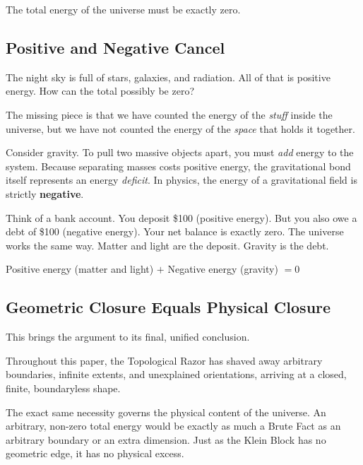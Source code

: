 \documentclass[11pt]{article}
\theoremstyle{canonstyle}
\begin{document}
\begin{keyresult}
The total energy of the universe must be exactly zero.
\end{keyresult}

\subsection{Positive and Negative Cancel}

\begin{reflect}
The night sky is full of stars, galaxies, and radiation. All of that is positive energy. How can the total possibly be zero?
\end{reflect}

The missing piece is that we have counted the energy of the \emph{stuff} inside the universe, but we have not counted the energy of the \emph{space} that holds it together. 

Consider gravity. To pull two massive objects apart, you must \emph{add} energy to the system. Because separating masses costs positive energy, the gravitational bond itself represents an energy \emph{deficit}. In physics, the energy of a gravitational field is strictly \textbf{negative}.

Think of a bank account. You deposit \$100 (positive energy). But you also owe a debt of \$100 (negative energy). Your net balance is exactly zero. The universe works the same way. Matter and light are the deposit. Gravity is the debt. 

\begin{keyresult}
Positive energy (matter and light) $+$ Negative energy (gravity) $= 0$
\end{keyresult}

\subsection{Geometric Closure Equals Physical Closure}

This brings the argument to its final, unified conclusion. 

Throughout this paper, the Topological Razor has shaved away arbitrary boundaries, infinite extents, and unexplained orientations, arriving at a closed, finite, boundaryless shape. 

The exact same necessity governs the physical content of the universe. An arbitrary, non-zero total energy would be exactly as much a Brute Fact as an arbitrary boundary or an extra dimension. Just as the Klein Block has no geometric edge, it has no physical excess. 
\end{document}
